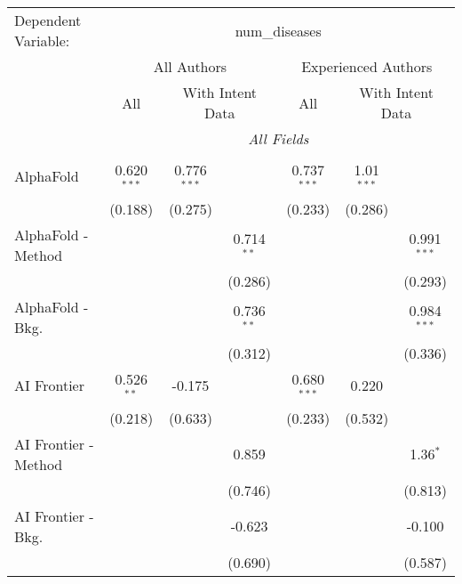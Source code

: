 \begingroup
\centering
\begin{tabular}{lcccccc}
   \tabularnewline \midrule \midrule
   Dependent Variable: & \multicolumn{6}{c}{num\_diseases}\\
 & \multicolumn{3}{c}{All Authors} & \multicolumn{3}{c}{Experienced Authors} \\
\cmidrule(lr){2-4} \cmidrule(lr){5-7}
 & \multicolumn{1}{c}{All} & \multicolumn{2}{c}{With Intent Data} & \multicolumn{1}{c}{All} & \multicolumn{2}{c}{With Intent Data} \\
\cmidrule(lr){2-2} \cmidrule(lr){3-4} \cmidrule(lr){5-5} \cmidrule(lr){6-7}
 & \multicolumn{6}{c}{\textit{All Fields}} \\ \\
   AlphaFold            & 0.620$^{***}$ & 0.776$^{***}$ &              & 0.737$^{***}$ & 1.01$^{***}$ &   \\   
                        & (0.188)       & (0.275)       &              & (0.233)       & (0.286)      &   \\   
   AlphaFold - Method   &               &               & 0.714$^{**}$ &               &              & 0.991$^{***}$\\   
                        &               &               & (0.286)      &               &              & (0.293)\\   
   AlphaFold - Bkg.     &               &               & 0.736$^{**}$ &               &              & 0.984$^{***}$\\   
                        &               &               & (0.312)      &               &              & (0.336)\\   
   AI Frontier          & 0.526$^{**}$  & -0.175        &              & 0.680$^{***}$ & 0.220        &   \\   
                        & (0.218)       & (0.633)       &              & (0.233)       & (0.532)      &   \\   
   AI Frontier - Method &               &               & 0.859        &               &              & 1.36$^{*}$\\   
                        &               &               & (0.746)      &               &              & (0.813)\\   
   AI Frontier - Bkg.   &               &               & -0.623       &               &              & -0.100\\   
                        &               &               & (0.690)      &               &              & (0.587)\\   

\end{tabular}
